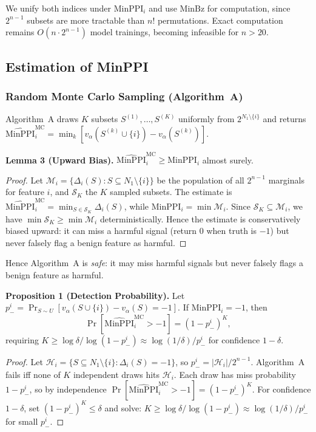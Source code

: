 \documentclass{article} %
\begin{document}
We unify both indices under $\text{MinPPI}_i$ and use $\text{MinBz}$ for computation, since $2^{n-1}$ subsets are more tractable than $n!$ permutations. Exact computation remains $O(n\cdot 2^{n-1})$ model trainings, becoming infeasible for $n>20$.

\subsection{Estimation of MinPPI}
\label{sec:estimation}

\subsubsection{Random Monte Carlo Sampling (Algorithm~A)}

Algorithm~A draws $K$ subsets $S^{(1)},\dots,S^{(K)}$ uniformly from $2^{N_1\setminus\{i\}}$ and returns $\widehat{\text{MinPPI}}_i^{\text{MC}} = \min_{k} [v_\alpha(S^{(k)}\cup\{i\}) - v_\alpha(S^{(k)})]$.

\textbf{Lemma 3 (Upward Bias).}
$\widehat{\text{MinPPI}}_i^{\text{MC}} \geq \text{MinPPI}_i$ almost surely.

\begin{proof}
Let $\mathcal{M}_i = \{\Delta_i(S) : S \subseteq N_1 \setminus \{i\}\}$ be the population of all $2^{n-1}$ marginals for feature $i$, and $\mathcal{S}_K$ the $K$ sampled subsets. The estimate is $\widehat{\text{MinPPI}}_i^{\text{MC}} = \min_{S \in \mathcal{S}_K} \Delta_i(S)$, while $\text{MinPPI}_i = \min \mathcal{M}_i$. Since $\mathcal{S}_K \subseteq \mathcal{M}_i$, we have $\min \mathcal{S}_K \geq \min \mathcal{M}_i$ deterministically. Hence the estimate is conservatively biased upward: it can miss a harmful signal (return $0$ when truth is $-1$) but never falsely flag a benign feature as harmful.
\end{proof}

Hence Algorithm~A is \emph{safe}: it may miss harmful signals but never falsely flags a benign feature as harmful.

\textbf{Proposition 1 (Detection Probability).}
Let $p_-^i = \Pr_{S\sim U}[v_\alpha(S\cup\{i\}) - v_\alpha(S) = -1]$. If $\text{MinPPI}_i = -1$, then
\begin{equation}
\Pr[\widehat{\text{MinPPI}}_i^{\text{MC}} > -1] = (1 - p_-^i)^K,
\label{eq:prop1}
\end{equation}
requiring $K \geq \log\delta / \log(1-p_-^i) \approx \log(1/\delta)/p_-^i$ for confidence $1-\delta$.

\begin{proof}
Let $\mathcal{H}_i = \{S \subseteq N_1 \setminus \{i\} : \Delta_i(S) = -1\}$, so $p_-^i = |\mathcal{H}_i| / 2^{n-1}$. Algorithm~A fails iff none of $K$ independent draws hits $\mathcal{H}_i$. Each draw has miss probability $1 - p_-^i$, so by independence $\Pr[\widehat{\text{MinPPI}}_i^{\text{MC}} > -1] = (1 - p_-^i)^K$. For confidence $1-\delta$, set $(1 - p_-^i)^K \leq \delta$ and solve: $K \geq \log\delta / \log(1-p_-^i) \approx \log(1/\delta)/p_-^i$ for small $p_-^i$.
\end{proof}
\end{document}
